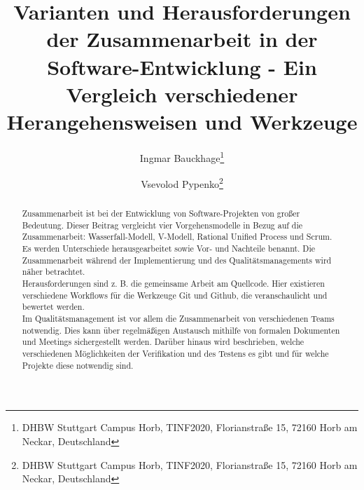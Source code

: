 \documentclass[]{lni}
\begin{document}
\title[Zusammenarbeit in der Software-Entwicklung]{Varianten und Herausforderungen der Zusammenarbeit in der Software-Entwicklung - Ein Vergleich verschiedener Herangehensweisen und Werkzeuge}
\author[Ingmar Bauckhage \and Vsevolod Pypenko]
{Ingmar Bauckhage\footnote{DHBW Stuttgart Campus Horb, TINF2020, Florianstraße 15, 72160 Horb am Neckar,
Deutschland } \and
Vsevolod Pypenko\footnote{DHBW Stuttgart Campus Horb, TINF2020, Florianstraße 15, 72160 Horb am Neckar, Deutschland
}}
\maketitle

\begin{abstract}
Zusammenarbeit ist bei der Entwicklung von Software-Projekten von großer Bedeutung. Dieser Beitrag vergleicht vier Vorgehensmodelle in Bezug auf die Zusammenarbeit: Wasserfall-Modell, V-Modell, Rational Unified Process und Scrum. Es werden Unterschiede herausgearbeitet sowie Vor- und Nachteile benannt. Die Zusammenarbeit während der Implementierung und des Qualitätsmanagements wird näher betrachtet.\\
Herausforderungen sind z. B. die gemeinsame Arbeit am Quellcode. Hier existieren verschiedene Workflows für die Werkzeuge Git und Github, die veranschaulicht und bewertet werden.\\
Im Qualitätsmanagement ist vor allem die Zusammenarbeit von verschiedenen Teams notwendig. Dies kann über regelmäßigen Austausch mithilfe von formalen Dokumenten und Meetings sichergestellt werden. Darüber hinaus wird beschrieben, welche verschiedenen Möglichkeiten der Verifikation und des Testens es gibt und für welche Projekte diese notwendig sind. 
\end{abstract}
\end{document}
